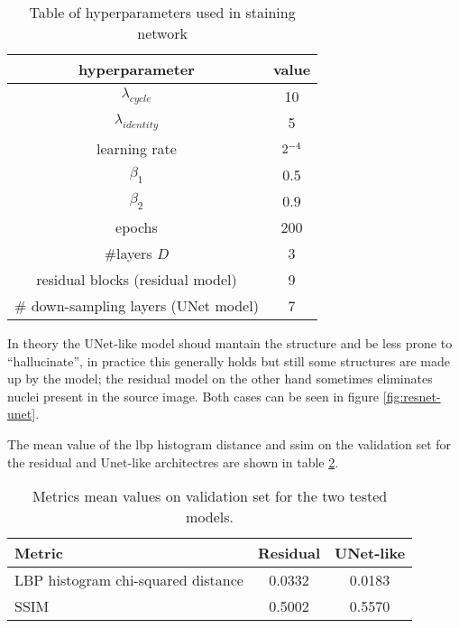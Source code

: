 \documentclass[../main.tex]{subfiles}
\begin{document}
\begin{table}
\centering
\begin{tabular}{cc}
\toprule
hyperparameter & value \\
\midrule
$\lambda_{cycle}$ & 10 \\
$\lambda_{identity}$ & 5 \\
learning rate & $2 \time 10^{-4}$ \\
$\beta_1$ & 0.5 \\
$\beta_2$ & 0.9 \\
epochs & 200 \\
\#layers $D$ & 3 \\
residual blocks (residual model) & 9 \\
\# down-sampling layers (UNet model) & 7 \\
\bottomrule
\end{tabular}
\caption{Table of hyperparameters used in staining network}
\label{tab:hyperparameters}
\end{table}

In theory the UNet-like model shoud mantain the structure and be less prone
to ``hallucinate'', in practice this generally holds but still some structures
are made up by the model; the residual model on the other hand sometimes
eliminates nuclei present in the source image. Both cases can be seen in figure
\ref{fig:resnet-unet}.

The mean value of the \gls{lbp} histogram distance  and \gls{ssim} on the
validation set for the residual and Unet-like architectres are shown in table
\ref{tab:validation-stain}.

\begin{table}
\centering
\begin{tabular}{l|cc}
\toprule
Metric & Residual & UNet-like \\
\midrule
LBP histogram chi-squared distance & 0.0332 & 0.0183 \\
SSIM & 0.5002 & 0.5570 \\
\bottomrule
\end{tabular}
\caption{Metrics mean values on validation set for the two tested models.}
\label{tab:validation-stain}
\end{table}
\end{document}
